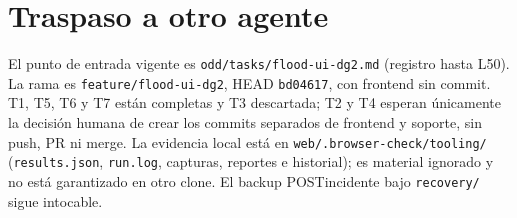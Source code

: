 \documentclass{article}
\begin{document}
\section{Traspaso a otro agente}
El punto de entrada vigente es \texttt{odd/tasks/flood-ui-dg2.md} (registro hasta L50). La rama es \texttt{feature/flood-ui-dg2}, HEAD \texttt{bd04617}, con frontend sin commit. T1, T5, T6 y T7 están completas y T3 descartada; T2 y T4 esperan únicamente la decisión humana de crear los commits separados de frontend y soporte, sin push, PR ni merge. La evidencia local está en \texttt{web/.browser-check/tooling/} (\texttt{results.json}, \texttt{run.log}, capturas, reportes e historial); es material ignorado y no está garantizado en otro clone. El backup POSTincidente bajo \texttt{recovery/} sigue intocable.
\end{document}
